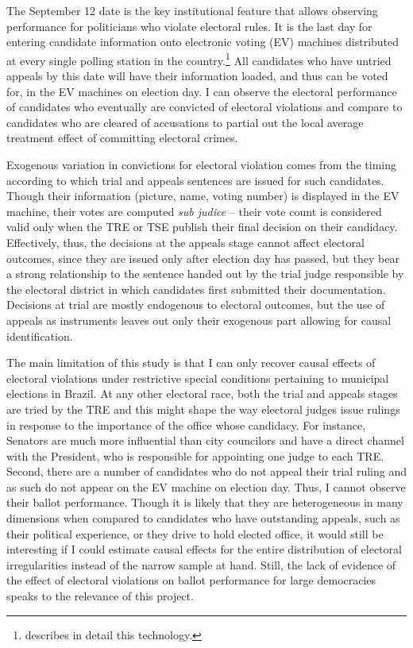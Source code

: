 \documentclass[11pt]{article}
\begin{document}
The September 12 date is the key institutional feature that allows observing performance for politicians who violate electoral rules. It is the last day for entering candidate information onto electronic voting (EV) machines distributed at every single polling station in the country.\footnote{\citet{FujiwaraVotingTechnologyPolitical2015} describes in detail this technology.} All candidates who have untried appeals by this date will have their information loaded, and thus can be voted for, in the EV machines on election day. I can observe the electoral performance of candidates who eventually are convicted of electoral violations and compare to candidates who are cleared of accusations to partial out the local average treatment effect of committing electoral crimes.

Exogenous variation in convictions for electoral violation comes from the timing according to which trial and appeals sentences are issued for such candidates. Though their information (picture, name, voting number) is displayed in the EV machine, their votes are computed \emph{sub judice} -- their vote count is considered valid only when the TRE or TSE publish their final decision on their candidacy. Effectively, thus, the decisions at the appeals stage cannot affect electoral outcomes, since they are issued only after election day has passed, but they bear a strong relationship to the sentence handed out by the trial judge responsible by the electoral district in which candidates first submitted their documentation. Decisions at trial are mostly endogenous to electoral outcomes, but the use of appeals as instruments leaves out only their exogenous part allowing for causal identification.

The main limitation of this study is that I can only recover causal effects of electoral violations under restrictive special conditions pertaining to municipal elections in Brazil. At any other electoral race, both the trial and appeals stages are tried by the TRE and this might shape the way electoral judges issue rulings in response to the importance of the office whose candidacy. For instance, Senators are much more influential than city councilors and have a direct channel with the President, who is responsible for appointing one judge to each TRE. Second, there are a number of candidates who do not appeal their trial ruling and as such do not appear on the EV machine on election day. Thus, I cannot observe their ballot performance. Though it is likely that they are heterogeneous in many dimensions when compared to candidates who have outstanding appeals, such as their political experience, or they drive to hold elected office, it would still be interesting if I could estimate causal effects for the entire distribution of electoral irregularities instead of the narrow sample at hand. Still, the lack of evidence of the effect of electoral violations on ballot performance for large democracies speaks to the relevance of this project.
\end{document}
